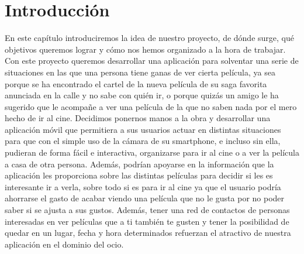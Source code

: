 
\cleardoublepage


\chapter{Introducción}
\label{makereference}


    En este capítulo introduciremos la idea de nuestro proyecto, de dónde surge, qué objetivos queremos lograr y cómo nos hemos organizado a la hora de trabajar.
    Con este proyecto queremos desarrollar una aplicación para solventar una serie de situaciones en las que una persona
    tiene ganas de ver cierta película, ya sea porque se ha encontrado el cartel de la nueva película
    de su saga favorita anunciada en la calle y no sabe con quién ir, o porque quizás un amigo le ha sugerido que le acompañe
    a ver una película de la que no saben nada por el mero hecho de ir al cine. 
    Decidimos ponernos manos a la obra y desarrollar una aplicación móvil que permitiera a sus usuarios actuar en distintas situaciones
    para que con el simple uso de la cámara de su smartphone, e incluso sin ella, pudieran de forma
    fácil e interactiva, organizarse para ir al cine o a ver la película a casa de otra persona. Además, podrían apoyarse en la 
    información que la aplicación les proporciona sobre las distintas películas para decidir si les es interesante ir a verla, sobre todo 
    si es para ir al cine ya que el usuario podría ahorrarse el gasto de acabar viendo una película que no le gusta por no poder saber si se 
    ajusta a sus gustos. Además, tener una red de contactos de personas interesadas en ver películas que a ti también te gusten y tener la posibilidad
    de quedar en un lugar, fecha y hora determinados refuerzan el atractivo de nuestra aplicación en el dominio del ocio.

